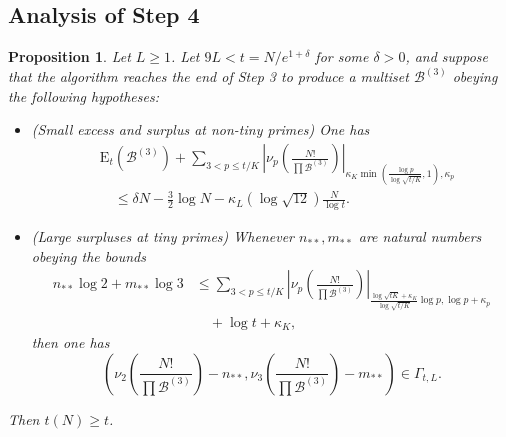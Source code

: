 \documentclass[12pt,a4paper,reqno]{amsart}
\numberwithin{equation}{section}
\theoremstyle{plain}
\newtheorem{proposition}[theorem]{Proposition}
\theoremstyle{definition}
\newcommand\tuple{{\mathcal B}}
\newcommand\excess{{\mathrm{E}}}
\begin{document}
\subsection{Analysis of Step 4}

\begin{proposition}\label{step4-reduce}  Let $L \geq 1$.  Let $9L < t = N/e^{1+\delta}$ for some $\delta>0$, and suppose that the algorithm reaches the end of Step 3 to produce a multiset $\tuple^{(3)}$ obeying the following hypotheses:
  \begin{itemize}
  \item[(i)] (Small excess and surplus at non-tiny primes) One has
\begin{equation}\label{new-balance-5}
    \begin{split}
&      \excess_t(\tuple^{(3)}) + \sum_{3 < p \leq t/K}
   \left|\nu_p\left(\frac{N!}{\prod \tuple^{(3)}}\right)\right|_{\kappa_K \min(\frac{\log p}{\log\sqrt{t/K}},1),\kappa_p}\\
&\quad    \leq \delta N - \frac{3}{2} \log N - \kappa_L (\log \sqrt{12}) \frac{N}{\log t}.
    \end{split}
  \end{equation}
  \item[(ii)] (Large surpluses at tiny primes) 
  Whenever $n_{**}, m_{**}$ are natural numbers obeying the bounds
  \begin{align*}
   n_{**} \log 2 + m_{**} \log 3 &\leq 
    \sum_{3 < p \leq t/K}
    \left|\nu_p\left(\frac{N!}{\prod \tuple^{(3)}}\right)\right|_{\frac{\log \sqrt{tK} + \kappa_K}{\log\sqrt{t/K}} \log p,\log p+\kappa_p}\\
  &\quad  + \log t + \kappa_K,
  \end{align*}
    then one has
  $$\left( \nu_2\left(\frac{N!}{\prod \tuple^{(3)}}\right) - n_{**}, \nu_3\left(\frac{N!}{\prod \tuple^{(3)}}\right) - m_{**}\right) \in \Gamma_{t,L}.
  $$  
  \end{itemize}
     Then $t(N) \geq t$.
\end{proposition}
\end{document}
